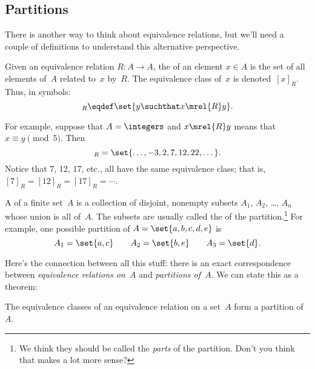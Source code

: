 \subsection{Partitions}

There is another way to think about equivalence relations, but we'll
need a couple of definitions to understand this alternative
perspective.

\begin{definition}\label{def:equiv_class}

Given an equivalence relation $R : A \to A$, the  of an element $x \in A$  is the set of all elements of~$A$
related to~$x$ by~$R$.  The equivalence class of~$x$ is
denoted~$[x]_R$.  Thus, in symbols:
\begin{equation*}
    [x]_R \eqdef \set{y \suchthat x \mrel{R} y}.
\end{equation*}
\end{definition}

For example, suppose that $A = \integers$ and $x \mrel{R} y$ means
that $x \equiv y \pmod{5}$.  Then
\begin{equation*}
    [7]_R = \set{\dots, -3, 2, 7, 12, 22, \dots}.
\end{equation*}
Notice that 7, 12, 17, etc., all have the same equivalence class; that
is, $[7]_R = [12]_R = [17]_R = \cdots$.

\begin{definition}\label{def:partition}

A  of a finite set~$A$ is a collection of disjoint,
nonempty subsets $A_1$, $A_2$, \dots, $A_n$ whose union is all of~$A$.
The subsets are usually called the  of the
partition.\footnote{We think they should be called the \emph{parts} of
  the partition. Don't you think that makes a lot more sense?}  For
example, one possible partition of $A = \set{a, b, c, d, e}$ is
\begin{equation*}
    A_1 = \set{a, c}
    \qquad
    A_2 = \set{b, e}
    \qquad
    A_3 = \set{d}.
\end{equation*}
\end{definition}

Here's the connection between all this stuff: there is an exact
correspondence  between \emph{equivalence relations on~$A$} and
\emph{partitions of~$A$}.  We can state this as a theorem:

\begin{theorem}
The equivalence classes of an equivalence relation on a set~$A$ form a
partition of~$A$.
\end{theorem}

